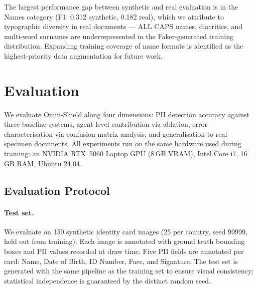 \documentclass[conference]{IEEEtran}
\begin{document}
The largest performance gap between synthetic and
real evaluation is in the Names category
(F1: 0.312 synthetic, 0.182 real), which we
attribute to typographic diversity in real documents
--- ALL CAPS names, diacritics, and multi-word
surnames are underrepresented in the Faker-generated
training distribution.
Expanding training coverage of name formats is
identified as the highest-priority data augmentation
for future work.

\section{Evaluation}
\label{sec:evaluation}

We evaluate Omni-Shield along four dimensions:
PII detection accuracy against three baseline systems,
agent-level contribution via ablation, error
characterisation via confusion matrix analysis,
and generalisation to real specimen documents.
All experiments run on the same hardware used during
training: an NVIDIA RTX~5060 Laptop GPU (8\,GB VRAM),
Intel Core i7, 16\,GB RAM, Ubuntu 24.04.

\subsection{Evaluation Protocol}

\paragraph{Test set.}
We evaluate on 150 synthetic identity card images
(25 per country, seed 99999, held out from training).
Each image is annotated with ground truth bounding
boxes and PII values recorded at draw time.
Five PII fields are annotated per card: Name, Date
of Birth, ID Number, Face, and Signature.
The test set is generated with the same pipeline
as the training set to ensure visual consistency;
statistical independence is guaranteed by the
distinct random seed.
\end{document}
